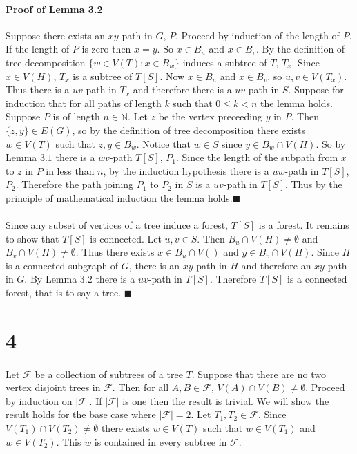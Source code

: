 \documentclass[letterpaper,12pt,oneside,onecolumn]{report}
\begin{document}
\paragraph{Proof of Lemma 3.2}
Suppose there exists an $xy$-path in $G$, $P$. Proceed by induction of the length of $P$. If the length of $P$ is zero then $x=y$. So $x \in B_u$ and $x \in B_v$. By the definition of tree decomposition $\{w \in V(T) : x \in B_w \}$ induces a subtree of $T$, $T_x$. Since $x \in V(H)$, $T_x$ is a subtree of $T[S]$. Now $x \in B_u$ and $x \in B_v$, so $u, v \in V(T_x)$. Thus there is a $uv$-path in $T_x$ and therefore there is a $uv$-path in $S$. Suppose for induction that for all paths of length $k$ such that $0\leq k < n$ the lemma holds. Suppose $P$ is of length $n \in \mathbb{N}$. Let $z$ be the vertex preceeding $y$ in $P$. Then $\{z,y\} \in E(G)$, so by the definition of tree decomposition there exists $w \in V(T)$ such that $z,y \in B_w$. Notice that $w \in S$ since $y \in B_w \cap V(H)$. So by Lemma $3.1$ there is a $wv$-path $T[S]$, $P_1$. Since the length of the subpath from $x$ to $z$ in $P$ in less than $n$, by the induction hypothesis there is a $uw$-path in $T[S]$, $P_2$. Therefore the path joining $P_1$ to $P_2$ in $S$ is a $uv$-path in $T[S]$. Thus by the principle of mathematical induction the lemma holds.$\blacksquare$
\paragraph{}
Since any subset of vertices of a tree induce a forest, $T[S]$ is a forest. It remains to show that $T[S]$ is connected. Let $u,v \in S$. Then $B_u \cap V(H) \neq \emptyset$ and $B_v \cap V(H) \neq \emptyset$. Thus there exists $x \in B_u \cap V()$ and $y \in B_v \cap V(H)$. Since $H$ is a connected subgraph of $G$, there is an $xy$-path in $H$ and therefore an $xy$-path in $G$. By Lemma $3.2$ there is a $uv$-path in $T[S]$. Therefore $T[S]$ is a connected forest, that is to say a tree. $\blacksquare$
\section*{4}
\paragraph{}
Let $\mathcal{F}$ be a collection of subtrees of a tree $T$. Suppose that there are no two vertex disjoint trees in $\mathcal{F}$. Then for all $A, B \in \mathcal{F}$, $V(A) \cap V(B) \neq \emptyset$. Proceed by induction on $|\mathcal{F}|$. If $|\mathcal{F}|$ is one then the result is trivial. We will show the result holds for the base case where $|\mathcal{F}| = 2$. Let $T_1, T_2 \in \mathcal{F}$. Since $V(T_1) \cap V(T_2) \neq \emptyset$ there exists $w \in V(T)$ such that $w \in V(T_1)$ and $w \in V(T_2)$. This $w$ is contained in every subtree in $\mathcal{F}$.
\end{document}
